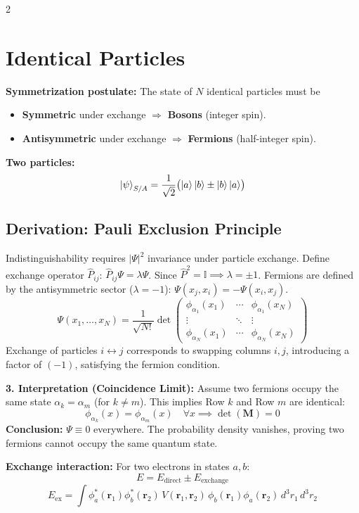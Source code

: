 \documentclass[9pt,a4paper]{article} %
\begin{document}
\begin{multicols}{2}
\section{Identical Particles}

\textbf{Symmetrization postulate:} The state of $N$ identical particles must be
\begin{itemize}
  \item \textbf{Symmetric} under exchange $\Rightarrow$ \textbf{Bosons} (integer spin).
  \item \textbf{Antisymmetric} under exchange $\Rightarrow$ \textbf{Fermions} (half-integer spin).
\end{itemize}

\textbf{Two particles:}
\[
\ket{\psi}_{S/A}=\frac{1}{\sqrt{2}}\bigl(\ket{a}\ket{b}\pm\ket{b}\ket{a}\bigr)
\]
\subsection{Derivation: Pauli Exclusion Principle}
Indistinguishability requires $|\Psi|^2$ invariance under particle exchange. Define exchange operator $\hat{P}_{ij}$:
$ \hat{P}_{ij}\Psi = \lambda \Psi $. Since $\hat{P}^2 = \mathbb{I} \implies \lambda = \pm 1$. 
Fermions are defined by the antisymmetric sector ($\lambda = -1$): $\Psi(x_j, x_i) = - \Psi(x_i, x_j)$.
\begin{equation}
    \Psi(x_1, \dots, x_N) = \frac{1}{\sqrt{N!}} \det 
    \begin{pmatrix} 
    \phi_{\alpha_1}(x_1) & \cdots & \phi_{\alpha_1}(x_N) \\[-1ex]
    \vdots & \ddots & \vdots \\[-1ex]
    \phi_{\alpha_N}(x_1) & \cdots & \phi_{\alpha_N}(x_N)
    \end{pmatrix}
\end{equation}
Exchange of particles $i \leftrightarrow j$ corresponds to swapping columns $i, j$, introducing a factor of $(-1)$, satisfying the fermion condition.

\textbf{3. Interpretation (Coincidence Limit):}
Assume two fermions occupy the same state $\alpha_k = \alpha_m$ (for $k \neq m$). This implies Row $k$ and Row $m$ are identical:
\[ \phi_{\alpha_k}(x) = \phi_{\alpha_m}(x) \quad \forall x \implies \det(\mathbf{M}) = 0 \]
\textbf{Conclusion:} $\Psi \equiv 0$ everywhere. The probability density vanishes, proving two fermions cannot occupy the same quantum state.

\textbf{Exchange interaction:} For two electrons in states $a,b$:
\[
E=E_{\text{direct}}\pm E_{\text{exchange}}
\]
\[
E_{\text{ex}}=\int\phi_a^*(\mathbf{r}_1)\phi_b^*(\mathbf{r}_2)\,V(\mathbf{r}_1,\mathbf{r}_2)\,\phi_b(\mathbf{r}_1)\phi_a(\mathbf{r}_2)\,d^3r_1\,d^3r_2
\]


\end{multicols}
\end{document}
